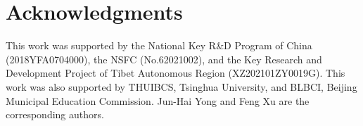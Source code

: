 \section{Acknowledgments}

This work was supported by the National Key R\&D Program of China (2018YFA0704000), the NSFC (No.62021002), and the Key Research and Development Project of Tibet Autonomous Region (XZ202101ZY0019G). This work was also supported by THUIBCS, Tsinghua University, and BLBCI, Beijing Municipal Education Commission. Jun-Hai Yong and Feng Xu are the corresponding authors.